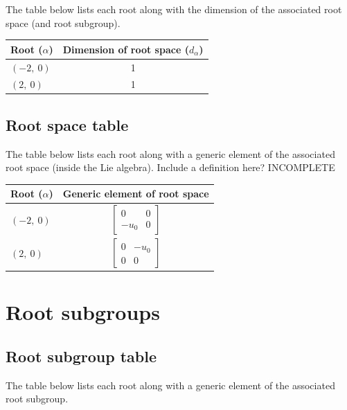 \documentclass[11pt]{article}
\newcommand{\noi}{\noindent}
\theoremstyle{definition}
\begin{document}
The table below lists each root along with the dimension of the associated root space (and root subgroup).

\bigskip

\noindent \begin{tabular}{|l|c|}
    \hline
    \textbf{Root ($\alpha$)} & \textbf{Dimension of root space ($d_{\alpha}$)} \\
    \hline
    $\left( -2, \  0\right)$ & 1 \\
    \hline
    $\left( 2, \  0\right)$ & 1 \\
    \hline
\end{tabular}


\subsection{Root space table}

\noi The table below lists each root along with a generic element of the associated root space (inside the Lie algebra). Include a definition here? INCOMPLETE

\bigskip

\noindent \begin{tabular}{|l|c|}
    \hline
    \textbf{Root ($\alpha$)} & \textbf{Generic element of root space} \\
    \hline
    $\left( -2, \  0\right)$ & $\left[\begin{matrix}0 & 0\\- u_{0} & 0\end{matrix}\right]$ \\
    \hline
    $\left( 2, \  0\right)$ & $\left[\begin{matrix}0 & - u_{0}\\0 & 0\end{matrix}\right]$ \\
    \hline
\end{tabular}


\newpage
\section{Root subgroups}

\subsection{Root subgroup table}

\noi The table below lists each root along with a generic element of the associated root subgroup.
\end{document}
